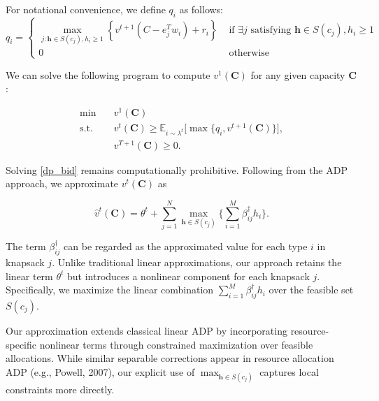 For notational convenience, we define $q_i$ as follows:
\begin{equation*}
    q_i= \begin{cases}\max _{j: \bm{h} \in S\left(c_j\right), h_i \geq 1}\left\{v^{t+1}\left(C-e_j^T w_i\right)+r_i\right\} & \text { if } \exists j \text{ satisfying } \bm{h} \in S\left(c_j\right), h_i \geq 1 \\ 0 & \text { otherwise }\end{cases}
\end{equation*}

We can solve the following program to compute $v^1(\bm{C})$ for any given capacity $\bm{C}$:

\begin{equation}\label{dp_bid}
    \begin{aligned}
    \min \quad & v^{1}(\bm{C}) \\
    \mathrm{s.t.} \quad & v^{t}(\bm{C}) \geq \mathbb{E}_{i \sim \lambda^t}\Bigg[\max\Big\{ q_{i}, v^{t+1}(\bm{C})\Big\}\Bigg], \\
    & v^{T+1}(\bm{C}) \geq 0.
    \end{aligned}
\end{equation}


Solving \eqref{dp_bid} remains computationally prohibitive. Following from the ADP approach, we approximate $v^{t}(\bm{C})$ as 

\begin{equation}\label{appro_dp}
    \hat{v}^{t}(\bm{C}) = \theta^{t} + \sum_{j=1}^{N} \max_{\bm{h} \in S(c_{j})} \{\sum_{i=1}^{M} \beta_{ij}^{\dag} h_{i}\}.
\end{equation}

The term $\beta_{ij}^{\dag}$ can be regarded as the approximated value for each type $i$ in knapsack $j$. Unlike traditional linear approximations, our approach retains the linear term $\theta^{t}$ but introduces a nonlinear component for each knapsack $j$. Specifically, we maximize the linear combination $\sum_{i=1}^{M} \beta_{ij}^{\dag} h_{i}$ over the feasible set $S(c_{j})$.

Our approximation extends classical linear ADP by incorporating resource-specific nonlinear terms through constrained maximization over feasible allocations. While similar separable corrections appear in resource allocation ADP (e.g., Powell, 2007), our explicit use of $\max_{\bm{h} \in S(c_j)}$ captures local constraints more directly.



